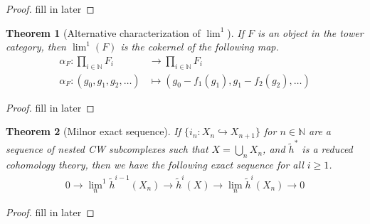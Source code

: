 \documentclass[12pt, notitlepage]{article}
\newtheorem{thm}{Theorem}[section]
\theoremstyle{definition}
\newcommand{\redco}{\widetilde{h}}
\begin{document}
\begin{proof}
  fill in later
\end{proof}

\begin{thm}[Alternative characterization of $\lim^1$]
  If $F$ is an object in the tower category, then $\lim^1(F)$ is the cokernel of the following map.
  \begin{align*}
    \alpha_F : \prod_{i \in \mathbb{N}} F_i &\to \prod_{i \in \mathbb{N}} F_i \\
    \alpha_F : (g_0, g_1, g_2, \ldots) &\mapsto \left(g_0 - f_1(g_1), g_1 - f_2(g_2), \ldots \right)
  \end{align*}
\end{thm}

\begin{proof}
  fill in later
\end{proof}

\begin{thm}[Milnor exact sequence] \label{thm-milnor} If $\{ i_n : X_n \hookrightarrow X_{n+1} \}$
  for $n \in \mathbb{N}$ are a sequence of nested CW subcomplexes such that $X = \bigcup_n X_n$, and
  $\redco^{\ast}$ is a reduced cohomology theory, then we have the following exact sequence for all
  $i \geq 1$.
  \begin{align*}
    0 \rightarrow {\lim_{n}}^1 \redco^{i-1}(X_n) \rightarrow \redco^i(X) \rightarrow \lim_n \redco^i(X_n) \rightarrow 0
  \end{align*}
\end{thm}

\begin{proof}
  fill in later
\end{proof}

%  
\end{document}
